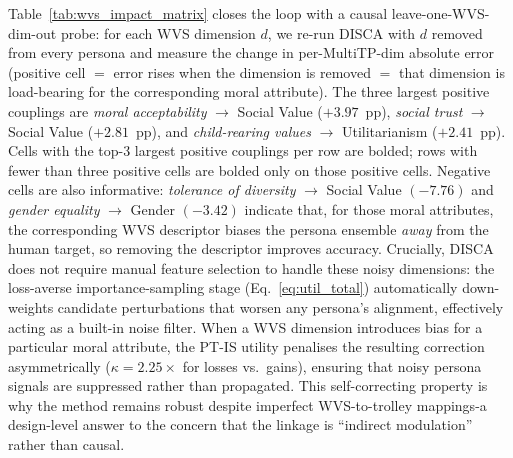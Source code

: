 \documentclass{article}
\begin{document}
Table~\ref{tab:wvs_impact_matrix} closes the loop with a causal leave-one-WVS-dim-out probe: for each WVS dimension $d$, we re-run DISCA with $d$ removed from every persona and measure the change in per-MultiTP-dim absolute error (positive cell $=$ error rises when the dimension is removed $=$ that dimension is load-bearing for the corresponding moral attribute). The three largest positive couplings are \emph{moral acceptability} $\to$ Social Value ($+3.97$~pp), \emph{social trust} $\to$ Social Value ($+2.81$~pp), and \emph{child-rearing values} $\to$ Utilitarianism ($+2.41$~pp). Cells with the top-3 largest positive couplings per row are bolded; rows with fewer than three positive cells are bolded only on those positive cells. Negative cells are also informative: \emph{tolerance of diversity} $\to$ Social Value $(-7.76)$ and \emph{gender equality} $\to$ Gender $(-3.42)$ indicate that, for those moral attributes, the corresponding WVS descriptor biases the persona ensemble \emph{away} from the human target, so removing the descriptor improves accuracy. Crucially, DISCA does not require manual feature selection to handle these noisy dimensions: the loss-averse importance-sampling stage (Eq.~\ref{eq:util_total}) automatically down-weights candidate perturbations that worsen any persona's alignment, effectively acting as a built-in noise filter. When a WVS dimension introduces bias for a particular moral attribute, the PT-IS utility penalises the resulting correction asymmetrically ($\kappa{=}2.25{\times}$ for losses vs.\ gains), ensuring that noisy persona signals are suppressed rather than propagated. This self-correcting property is why the method remains robust despite imperfect WVS-to-trolley mappings-a design-level answer to the concern that the linkage is ``indirect modulation'' rather than causal.
\end{document}
